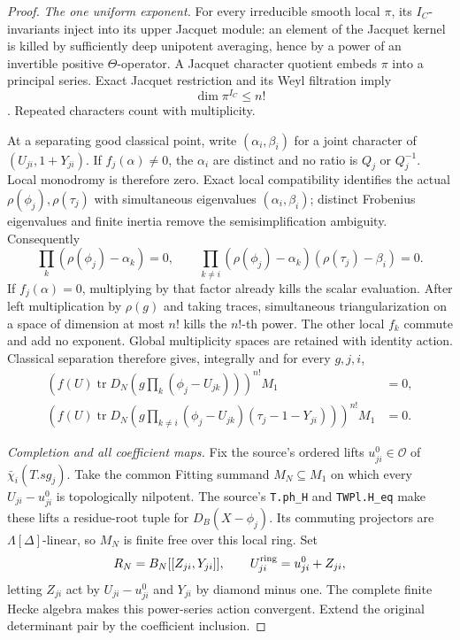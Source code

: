 \begin{proof}
\emph{The one uniform exponent.}
For every irreducible smooth local \(\pi\), its \(I_C\)-invariants
inject into its upper Jacquet module: an element of the Jacquet
kernel is killed by sufficiently deep unipotent averaging, hence
by a power of an invertible positive \(\Theta\)-operator.
A Jacquet character quotient embeds \(\pi\) into a principal
series.  Exact Jacquet restriction and its Weyl filtration imply
\[
                         \dim\pi^{I_C}\le n!
\]
\cite[Proposition 2.3 and Lemma 2.12]{SelmerTWBZ}.
Repeated characters count with multiplicity.

At a separating good classical point, write
\((\alpha_i,\beta_i)\) for a joint character of
\((U_{ji},1+Y_{ji})\).
If \(f_j(\alpha)\ne0\), the \(\alpha_i\) are distinct and no
ratio is \(Q_j\) or \(Q_j^{-1}\).  Local monodromy is therefore
zero.  Exact local compatibility identifies the actual
\(\rho(\phi_j),\rho(\tau_j)\) with simultaneous eigenvalues
\((\alpha_i,\beta_i)\); distinct Frobenius eigenvalues and finite
inertia remove the semisimplification ambiguity.  Consequently
\[
 \prod_k(\rho(\phi_j)-\alpha_k)=0,\qquad
 \prod_{k\ne i}(\rho(\phi_j)-\alpha_k)
                         (\rho(\tau_j)-\beta_i)=0.
\]
If \(f_j(\alpha)=0\), multiplying by that factor already kills
the scalar evaluation.  After left multiplication by \(\rho(g)\)
and taking traces, simultaneous triangularization on a space
of dimension at most \(n!\) kills the \(n!\)-th power.
The other local \(f_k\) commute and add no exponent.
Global multiplicity spaces are retained with identity action.
Classical separation therefore gives, integrally and for every
\(g,j,i\),
\begin{align*}
 \left(f(U)\operatorname{tr}D_N
       \left(g\prod_k(\phi_j-U_{jk})\right)\right)^{n!}M_1&=0,\\
 \left(f(U)\operatorname{tr}D_N
       \left(g\prod_{k\ne i}(\phi_j-U_{jk})
                             (\tau_j-1-Y_{ji})\right)\right)^{n!}M_1&=0.
\end{align*}

\emph{Completion and all coefficient maps.}
Fix the source's ordered lifts \(u^0_{ji}\in\mathcal O\) of
\(\bar\chi_i(T.sg_j)\).  Take the common Fitting summand
\(M_N\subseteq M_1\) on which every \(U_{ji}-u^0_{ji}\) is
topologically nilpotent.  The source's \texttt{T.ph\_H} and
\texttt{TWPl.H\_eq}
make these lifts a residue-root tuple for \(D_B(X-\phi_j)\).
Its commuting projectors are
\(\Lambda[\Delta]\)-linear, so \(M_N\) is finite free over this
local ring.  Set
\[
 R_N=B_N[[Z_{ji},Y_{ji}]],\qquad U^{\rm ring}_{ji}=u^0_{ji}+Z_{ji},
\]
letting \(Z_{ji}\) act by \(U_{ji}-u^0_{ji}\) and \(Y_{ji}\) by
diamond minus one.  The complete finite Hecke algebra makes this
power-series action convergent.  Extend the original determinant
pair by the coefficient inclusion.


\end{proof}
